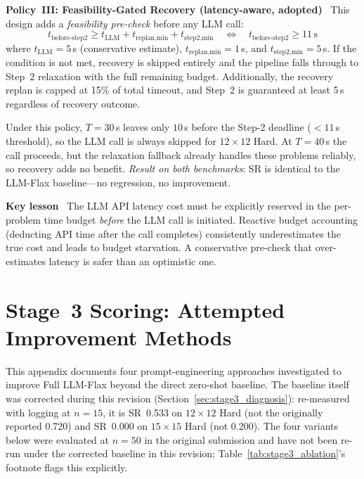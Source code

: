 \documentclass[letterpaper, 10pt, journal, twoside]{IEEEtran}
\newcommand{\sref}[1]{Section~\ref{#1}}
\newcommand{\tref}[1]{Table~\ref{#1}}
\newcommand{\myparagraph}[1]{\noindent\textbf{#1}~}
\newcommand{\method}{LLM-Flax\xspace}
\newcommand{\fullmethod}{Full LLM-Flax\xspace}
\begin{document}
\myparagraph{Policy~III: Feasibility-Gated Recovery (latency-aware, adopted)}
This design adds a \emph{feasibility pre-check} before any LLM call:
\begin{equation}
  t_\text{before-step2} \geq t_\text{LLM} + t_\text{replan,min} + t_\text{step2,min}
  \quad \Longleftrightarrow \quad t_\text{before-step2} \geq 11\,\text{s}
\end{equation}
where $t_\text{LLM} = 5$\,s (conservative estimate), $t_\text{replan,min} = 1$\,s, and $t_\text{step2,min} = 5$\,s.
If the condition is not met, recovery is skipped entirely and the pipeline falls through to Step~2 relaxation with the full remaining budget.
Additionally, the recovery replan is capped at 15\% of total timeout, and Step~2 is guaranteed at least 5\,s regardless of recovery outcome.

Under this policy, $T{=}30$\,s leaves only $10$\,s before the Step-2 deadline ($< 11$\,s threshold), so the LLM call is always skipped for $12{\times}12$ Hard.
At $T{=}40$\,s the call proceeds, but the relaxation fallback already handles these problems reliably, so recovery adds no benefit.
\emph{Result on both benchmarks}: SR is identical to the \method baseline—no regression, no improvement.

\myparagraph{Key lesson}
The LLM API latency cost must be explicitly reserved in the per-problem time budget \emph{before} the LLM call is initiated.
Reactive budget accounting (deducting API time after the call completes) consistently underestimates the true cost and leads to budget starvation.
A conservative pre-check that over-estimates latency is safer than an optimistic one.


\section{Stage~3 Scoring: Attempted Improvement Methods}
\label{app:stage3_improvements}

This appendix documents four prompt-engineering approaches investigated to improve \fullmethod beyond the direct zero-shot baseline.
The baseline itself was corrected during this revision (\sref{sec:stage3_diagnosis}): re-measured with logging at $n{=}15$, it is SR~0.533 on $12{\times}12$ Hard (not the originally reported 0.720) and SR~0.000 on $15{\times}15$ Hard (not 0.200).
The four variants below were evaluated at $n{=}50$ in the original submission and have not been re-run under the corrected baseline in this revision; \tref{tab:stage3_ablation}'s footnote flags this explicitly.
\end{document}

